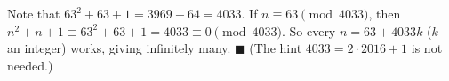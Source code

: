 Note that $63^2+63+1=3969+64=4033$. If $n\equiv63\pmod{4033}$, then $n^2+n+1\equiv63^2+63+1=4033\equiv0\pmod{4033}$. So every $n=63+4033k$ ($k$ an integer) works, giving infinitely many. $\blacksquare$ (The hint $4033=2\cdot2016+1$ is not needed.)
